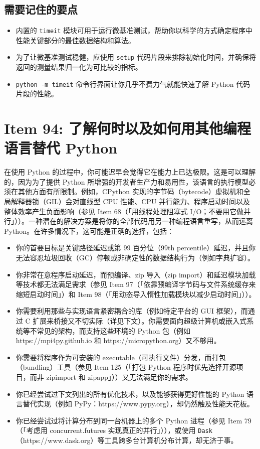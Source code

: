 \subsection{需要记住的要点}

\begin{itemize}
\item 内置的 \texttt{timeit} 模块可用于运行微基准测试，帮助你以科学的方式确定程序中性能关键部分的最佳数据结构和算法。
\item 为了让微基准测试稳健，应使用 \texttt{setup} 代码片段来排除初始化时间，并确保将返回的测量结果归一化为可比较的指标。
\item \texttt{python -m timeit} 命令行界面让你几乎不费力气就能快速了解 Python 代码片段的性能。
\end{itemize}

\section{Item 94: 了解何时以及如何用其他编程语言替代 Python}

在使用 Python 的过程中，你可能迟早会觉得它在能力上已达极限。这是可以理解的，因为为了提供 Python 所增强的开发者生产力和易用性，该语言的执行模型必须在其他方面有所限制。例如，CPython 实现的字节码（bytecode）虚拟机和全局解释器锁（GIL）会对直线型 CPU 性能、CPU 并行能力、程序启动时间以及整体效率产生负面影响（参见 Item 68（「用线程处理阻塞式 I/O；不要用它做并行」））。一种潜在的解决方案是将你的全部代码用另一种编程语言重写，从而远离 Python。在许多情况下，这可能是正确的选择，包括：

\begin{itemize}
\item 你的首要目标是关键路径延迟或第 99 百分位（99th percentile）延迟，并且你无法容忍垃圾回收（GC）停顿或非确定性的数据结构行为（例如字典扩容）。
\item 你非常在意程序启动延迟，而预编译、zip 导入（zip import）和延迟模块加载等技术都无法满足需求（参见 Item 97（「依靠预编译字节码与文件系统缓存来缩短启动时间」）和 Item 98（「用动态导入惰性加载模块以减少启动时间」））。
\item 你需要利用那些与实现语言紧密耦合的库（例如特定平台的 GUI 框架），而通过 C 扩展来桥接又不切实际（详见下文）。你需要面向超级计算机或嵌入式系统等不常见的架构，而支持这些环境的 Python 包（例如 https://mpi4py.github.io 和 https://micropython.org）又不够用。
\item 你需要将程序作为可安装的 executable（可执行文件）分发，而打包（bundling）工具（参见 Item 125（「打包 Python 程序时优先选择开源项目，而非 zipimport 和 zipapp」））又无法满足你的需求。
\item 你已经尝试过下文列出的所有优化技术，以及能够获得更好性能的 Python 语言替代实现（例如 PyPy：https://www.pypy.org），却仍然触及性能天花板。
\item 你已经尝试过将计算分布到同一台机器上的多个 Python 进程（参见 Item 79（「考虑用 concurrent.futures 实现真正的并行」）），或使用 \texttt{Dask}（https://www.dask.org）等工具跨多台计算机分布计算，却无济于事。
\end{itemize}


